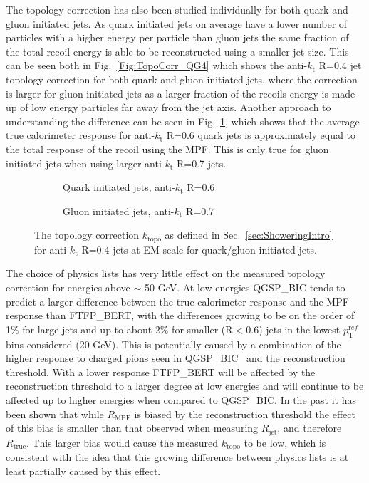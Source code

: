 The topology correction has also been studied individually for both quark and gluon initiated jets.
As quark initiated jets on average have a lower number of particles with a higher energy per particle than gluon jets the same fraction of the total recoil energy is able to be reconstructed using a smaller jet size.  
This can be seen both in Fig.~\ref{Fig:TopoCorr_QG4} which shows the anti-$k_\mathrm{t}$ R=0.4 jet topology correction for both quark and gluon initiated jets, where the correction is larger for gluon initiated jets as a larger fraction of the recoils energy is made up of low energy particles far away from the jet axis.  
Another approach to understanding the difference can be seen in Fig.~\ref{Fig:TopoCorr_QGSizes}, which shows that the average true calorimeter response for anti-$k_\mathrm{t}$ R=0.6 quark jets is approximately equal to the total response of the recoil using the MPF.  
This is only true for gluon initiated jets when using larger anti-$k_\mathrm{t}$ R=0.7 jets.  

\begin{figure}[!ht]
  \centering
  \begin{subfigure}{.5\textwidth}
    \centering
    \caption{Quark initiated jets, anti-$k_\mathrm{t}$ R=0.6}
  \end{subfigure}%
  \begin{subfigure}{.5\textwidth}  \centering
    \caption{Gluon initiated jets, anti-$k_\mathrm{t}$ R=0.7}
  \end{subfigure}
  \caption[Topology correction for quark/gluon initiated jets.]
{\small The topology correction $k_{\mathrm{topo}}$ as defined in Sec.~\ref{sec:ShoweringIntro} for anti-$k_\mathrm{t}$ R=0.4 jets at EM scale for quark/gluon initiated jets.  }
  \label{Fig:TopoCorr_QGSizes}
\end{figure}

The choice of physics lists has very little effect on the measured topology correction for energies above $\sim$ 50 GeV.  
At low energies QGSP\_BIC tends to predict a larger difference between the true calorimeter response and the MPF response than FTFP\_BERT, with the differences growing to be on the order of 1\% for large jets and up to about 2\% for smaller (R$<$0.6) jets in the lowest $p_{\mathrm T}^{\mathrm ref}$ bins considered (20 GeV).  
This is potentially caused by a combination of the higher response to charged pions seen in QGSP\_BIC~\cite{Zhang:2253040} and the reconstruction threshold.  
With a lower response FTFP\_BERT will be affected by the reconstruction threshold to a larger degree at low energies and will continue to be affected up to higher energies when compared to QGSP\_BIC.  
In the past it has been shown that while $R_{\mathrm{MPF}}$ is biased by the reconstruction threshold the effect of this bias is smaller than that observed when measuring $R_{\mathrm{jet}}$, and therefore $R_{\mathrm{true}}$. 
This larger bias would cause the measured $k_{\mathrm{topo}}$ to be low, which is consistent with the idea that this growing difference between physics lists is at least partially caused by this effect.  


